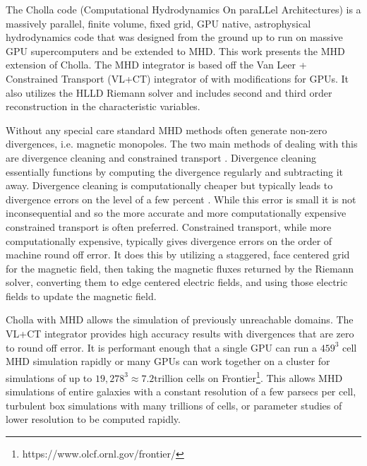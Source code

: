 The Cholla code (Computational Hydrodynamics On paraLLel Architectures)\citep{schneider_2015} is a massively parallel, finite volume, fixed grid, GPU native, astrophysical hydrodynamics code that was designed from the ground up to run on massive GPU supercomputers and be extended to MHD. This work presents the MHD extension of Cholla. The MHD integrator is based off the Van Leer + Constrained Transport (VL+CT) integrator of \cite{stone_2009} with modifications for GPUs. It also utilizes the HLLD Riemann solver and includes second and third order reconstruction in the characteristic variables.

Without any special care standard MHD methods often generate non-zero divergences, i.e. magnetic monopoles. The two main methods of dealing with this are divergence cleaning \citep{dedner_hyperbolic_2002} and constrained transport \citep{evans_1988}. Divergence cleaning essentially functions by computing the divergence regularly and subtracting it away. Divergence cleaning is computationally cheaper but typically leads to divergence errors on the level of a few percent \citep{pakmor_magnetizing_2020,van_de_voort_effect_2021}. While this error is small it is not inconsequential and so the more accurate and more computationally expensive constrained transport is often preferred. Constrained transport, while more computationally expensive, typically gives divergence errors on the order of machine round off error\citep{evans_1988,stone_athena_2008, stone_2009}. It does this by utilizing a staggered, face centered grid for the magnetic field, then taking the magnetic fluxes returned by the Riemann solver, converting them to edge centered electric fields, and using those electric fields to update the magnetic field\citep{evans_1988,stone_athena_2008, stone_2009}.

Cholla with MHD allows the simulation of previously unreachable domains. The VL+CT integrator provides high accuracy results with divergences that are zero to round off error. It is performant enough that a single GPU can run a $459^3$ cell MHD simulation rapidly or many GPUs can work together on a cluster for simulations of up to $19,278^3 \approx 7.2 \text{trillion}$ cells on Frontier\footnote{https://www.olcf.ornl.gov/frontier/}. This allows MHD simulations of entire galaxies with a constant resolution of a few parsecs per cell, turbulent box simulations with many trillions of cells, or parameter studies of lower resolution to be computed rapidly.

